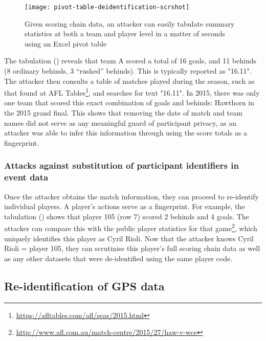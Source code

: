 \begin{figure}[h]
  \centering
  \texttt{[image: pivot-table-deidentification-scrshot]}
  \caption{Given scoring chain data, an attacker can easily tabulate summary statistics at both a team and player level in a matter of seconds using an Excel pivot table}
  \label{fig:pivot}
\end{figure}

The tabulation () reveals that team A scored a total of 16 goals, and 11 behinds (8 ordinary behinds, 3 ``rushed'' behinds). This is typically reported as "16.11". The attacker then consults a table of matches played during the season, such as that found at AFL Tables\footnote{\url{https://afltables.com/afl/seas/2015.html}}, and searches for text "16.11". In 2015, there was only one team that scored this exact combination of goals and behinds: Hawthorn in the 2015 grand final. This shows that removing the date of match and team names did not serve as any meaningful guard of participant privacy, as an attacker was able to infer this information through using the score totals as a fingerprint.

\subsubsection{Attacks against substitution of participant identifiers in event data}

Once the attacker obtains the match information, they can proceed to re-identify individual players. A player's actions serve as a fingerprint. For example, the tabulation () shows that player 105 (row 7) scored 2 behinds and 4 goals. The attacker can compare this with the public player statistics for that game\footnote{\url{http://www.afl.com.au/match-centre/2015/27/haw-v-wce}}, which uniquely identifies this player as Cyril Rioli. Now that the attacker knows Cyril Rioli = player 105, they can scrutinise this player's full scoring chain data as well as any other datasets that were de-identified using the same player code.

\subsection{Re-identification of GPS data}
\label{sec:de-identification-methods-gps}

